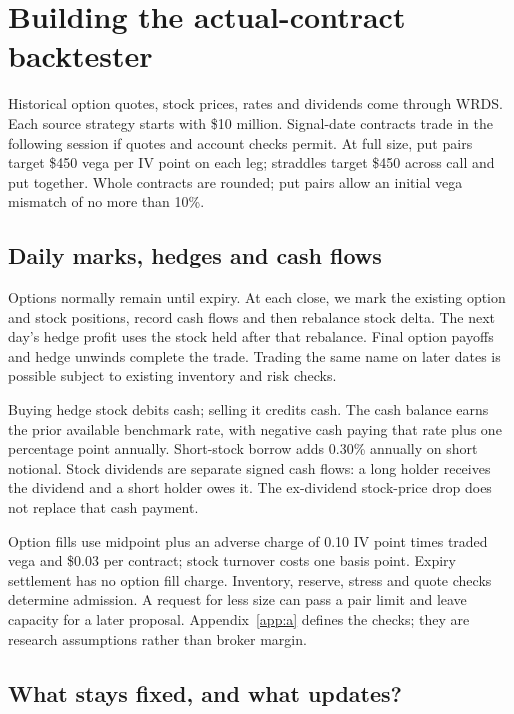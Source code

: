 \section{Building the actual-contract backtester}\label{sec:9}

Historical option quotes, stock prices, rates and dividends come through WRDS. Each source strategy starts with \$10 million. Signal-date contracts trade in the following session if quotes and account checks permit. At full size, put pairs target \$450 vega per IV point on each leg; straddles target \$450 across call and put together. Whole contracts are rounded; put pairs allow an initial vega mismatch of no more than 10\%.


\subsection*{Daily marks, hedges and cash flows}

Options normally remain until expiry. At each close, we mark the existing option and stock positions, record cash flows and then rebalance stock delta. The next day's hedge profit uses the stock held after that rebalance. Final option payoffs and hedge unwinds complete the trade. Trading the same name on later dates is possible subject to existing inventory and risk checks.


Buying hedge stock debits cash; selling it credits cash. The cash balance earns the prior available benchmark rate, with negative cash paying that rate plus one percentage point annually. Short-stock borrow adds 0.30\% annually on short notional. Stock dividends are separate signed cash flows: a long holder receives the dividend and a short holder owes it. The ex-dividend stock-price drop does not replace that cash payment.


Option fills use midpoint plus an adverse charge of 0.10 IV point times traded vega and \$0.03 per contract; stock turnover costs one basis point. Expiry settlement has no option fill charge. Inventory, reserve, stress and quote checks determine admission. A request for less size can pass a pair limit and leave capacity for a later proposal. Appendix~\ref{app:a} defines the checks; they are research assumptions rather than broker margin.


\subsection*{What stays fixed, and what updates?}


